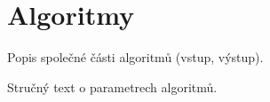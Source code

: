 \chapter{Algoritmy}\label{ch:algoritmy}

Popis společné části algoritmů (vstup, výstup).

Stručný text o parametrech algoritmů.

%
%








